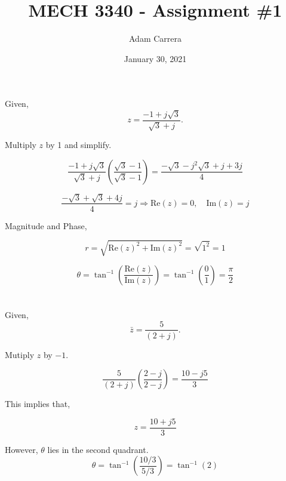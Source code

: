 \documentclass[12pt]{article}
\author{Adam Carrera}
\date{January 30, 2021}
\title{MECH 3340 - Assignment \#1}
\numberwithin{equation}{section}
\newcommand{\RE}{\mathrm{Re}}
\newcommand{\IM}{\mathrm{Im}}
\begin{document}
  \maketitle
  \section{}
  Given,
  \[
      z = \frac{-1 + j\sqrt{3}}{\sqrt{3} + j}
    .\]

  Multiply $ z $ by 1 and simplify.

  \begin{equation}
    \frac{-1 + j\sqrt{3}}{\sqrt{3} + j} \left( \frac{\sqrt{3} - 1}{\sqrt{3} - 1} \right) = \frac{-\sqrt{3} -j^2 \sqrt{3} + j + 3j}{4}
  \end{equation}

  \begin{equation}
    \frac{-\sqrt{3} + \sqrt{3} + 4j}{4} = j \Rightarrow \RE(z) = 0, \quad \IM(z) = j
  \end{equation}

  Magnitude and Phase,

  \begin{equation}
    r = \sqrt{\RE(z)^2 + \IM(z)^2} = \sqrt{1^2} = 1
  \end{equation}

  \begin{equation}
    \theta = \tan^{-1} \left( \frac{\RE(z)}{\IM(z)} \right) = \tan^{-1} \left( \frac{0}{1} \right) = \frac{\pi}{2}
  \end{equation}

  \newpage
  \section{}
  Given,
  \[
      \bar{z} = \frac{5}{(2+j)}
    .\]

  Mutiply $ z $ by $ -1. $

  \begin{equation}
    \frac{5}{(2+j)} \left( \frac{2 - j}{2 - j} \right) = \frac{10 - j5}{3}
  \end{equation}

  This implies that,

  \begin{equation}
    z = \frac{10 + j5}{3}
  \end{equation}

  However, $ \theta $ lies in the second quadrant.
  \begin{equation}
    \theta = \tan^{-1} \left( \frac{10/3}{5/3} \right) = \tan^{-1}(2)
  \end{equation}
\end{document}

